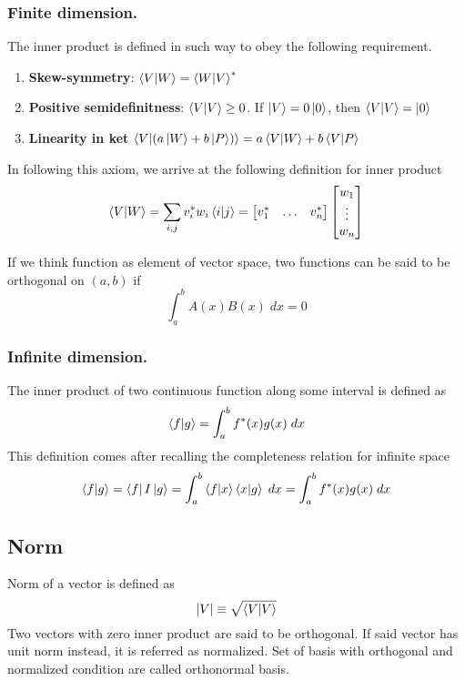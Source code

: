 \documentclass[../main.tex]{subfiles}
\begin{document}
\subsubsection*{Finite dimension.}
The inner product is defined in such way to obey the following requirement.
\begin{enumerate}
	\item \textbf{Skew-symmetry}: $\braket{V|W}=\braket{W|V}^*$
	\item \textbf{Positive semidefinitness}: $\braket{V|V}\geq 0$. If $\ket{V}=0\ket{0}$, then $\braket{V|V}=\ket{0}$
	\item \textbf{Linearity in ket} $\braket{V|(a \ket{W}+b \ket{P})}=a\braket{V|W}+b\braket{V|P}$
\end{enumerate}
In following this axiom, we arrive at the following definition for inner product
\begin{equation*}
	\braket{V|W}=\sum_{i,j}v_i^*w_i\braket{i|j}=\begin{bmatrix}
		v_1^* & \dots & v_n^*
	\end{bmatrix}
	\begin{bmatrix}
		w_1    \\
		\vdots \\
		w_n
	\end{bmatrix}
\end{equation*}

If we think function as element of vector space, two functions can be said to be orthogonal on $(a,b)$ if
\begin{equation*}
	\int_{a}^{b}A(x)B(x)\;dx=0
\end{equation*}

\subsubsection*{Infinite dimension.}
The inner product of two continuous function along some interval is defined as
\begin{equation*}
	\braket{f|g}=\int_{a}^{b}f ^*(x)g(x)\;dx
\end{equation*}
This definition comes after recalling the completeness relation for infinite space 
\begin{equation*}
	\braket{f|g}=\bra{f}I \ket{g}=\int_{a }^{b}\braket{f|x}\braket{x|g}\;dx=\int_{a }^{b} f ^*(x)g(x)\;dx
\end{equation*}

\subsection*{Norm}
Norm of a vector is defined as
\begin{equation*}
	|V|\equiv\sqrt{\braket{V|V}}
\end{equation*}
Two vectors with zero inner product are said to be orthogonal.
If said vector has unit norm instead, it is referred as normalized.
Set of basis with orthogonal and normalized condition are called orthonormal basis.
\end{document}
